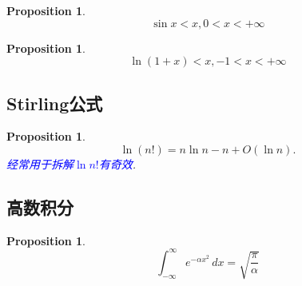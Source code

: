 \documentclass{article}
\newtheorem{proposition}[theorem]{Proposition}
\newcommand{\bluet}[1]{\textcolor{blue}{#1}}
\begin{document}
\begin{proposition}
\rm 
$$
\sin x < x , 0 < x < +\infty
$$
\end{proposition}

\begin{proposition}
\rm 
$$
\ln(1+x) < x,  -1< x < +\infty
$$
\end{proposition}

\subsection{Stirling公式}

\begin{proposition}
\rm 
$$
\ln(n!) = n\ln n-n+O(\ln n). 
$$
\bluet{经常用于拆解$\ln n!$有奇效}. 
\end{proposition}


\subsection{高数积分}

\begin{proposition}
\rm 
$$
\int _{-\infty }^{\infty }e^{-\alpha x^{2}}\,dx={\sqrt {\frac {\pi }{\alpha }}}
$$
\end{proposition}
\end{document}
